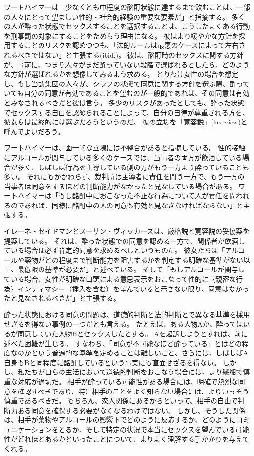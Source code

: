 \documentclass[paper=a4,book,openany]{jlreq}
\begin{document}
ワートハイマーは「少なくとも中程度の酩酊状態に達するまで飲むことは、一部の人々にとって望ましい性的・社会的経験の重要な要素だ」と指摘する\citep[p.251]{wertheimer03:_consen_sexual_relat}。
多くの人が酔った状態でセックスすることを選択することは、こうしたよくある行動を刑事罰の対象にすることをためらう理由になる。
彼はより緩やかな方針を採用することのリスクを認めつつも、「法的ルールは最悪のケースによって左右されるべきではない」と主張する(ibid.)。
彼は、酩酊時のセックスに関する方針が、事前に、つまり人々がまだ酔っていない段階で選ばれるとしたら、どのような方針が選ばれるかを想像してみるよう求める。
とりわけ女性の場合を想定し、もし当該集団の人々が、シラフの状態で同意に関する方針を選ぶ際、酔っていても自分の同意が有効であることを望むのが一般的であれば、その同意は有効とみなされるべきだと彼は言う。
多少のリスクがあったとしても、酔った状態でセックスする自由を認められることによって、自分の自律が尊重される方を、彼女らは最終的には選ぶだろうというのだ。
彼の立場を「寛容説」(lax view)と呼んでよいだろう。

ワートハイマーは、画一的な立場には不整合があると指摘している。
性的接触にアルコールが関与している多くのケースでは、当事者の両方が飲酒している場合が多く、しばしば行為を主導している側の方がもう一方より酔っていることも多い。
それにもかかわらず、裁判所は主導者に責任を問う一方で、もう一方の当事者は同意をするほどの判断能力がなかったと見なしている場合がある。
ワートハイマーは「もし酩酊中におこなった不正な行為について人が責任を問われるのであれば、同様に酩酊中の人の同意も有効と見なさなければならない」と主張する\citep[p.233]{wertheimer03:_consen_sexual_relat}。

イレーネ・セイドマンとスーザン・ヴィッカーズは、厳格説と寛容説の妥協案を提案している。
それは、酔った状態での同意を認める一方で、関係者が飲酒している場合は必ず肯定的同意を求めるべしというものだ。
彼女たちは「アルコールや薬物がどの程度まで判断能力を阻害するかを判定する明確な基準がない以上、最低限の基準が必要だ」と述べている。
そして「もしアルコールが関与している場合、女性が明確な口頭による意思表示をおこなって性的に｛親密な行為｝{インティマシー}（挿入を含む）を望んでいると示さない限り、同意はなかったと見なされるべきだ」と主張する\citep[p.486]{seidman05:_secon_wave}。

酔った状態における同意の問題は、道徳的判断と法的判断とで異なる基準を採用せざるを得ない事例の一つだとも言える。
たとえば、ある人物Aが、酔ってはいるが同意していた人物Bとセックスしたとする。
Aを起訴しようとすれば、前に述べた困難が生じる。
すなわち、「同意が不可能なほど酔っている」とはどの程度なのかという普遍的な基準を定めることは難しいこと、さらには、しばしばA自身もBと同程度に酩酊しているという事実にも直面せざるを得ない。
しかし、私たちが自らの生活において道徳的判断をおこなう場合には、より繊細で慎重な対応が適切だ。
相手が酔っている可能性がある場合には、明確で熱烈な同意を確認すべきであり、特に相手のことをよく知らない場合には、よりいっそう慎重であるべきだ。
もちろん、恋人関係にあるからといって、相手の自由で判断力ある同意を確保する必要がなくなるわけではない。
しかし、そうした関係は、相手が薬物やアルコールの影響下でどのように反応するか、どのようにコミュニケーションをとるか、そして特定の状況で本当にセックスを望んでいる可能性がどれほどあるかといったことについて、よりよく理解する手がかりを与えてくれる。
\end{document}
